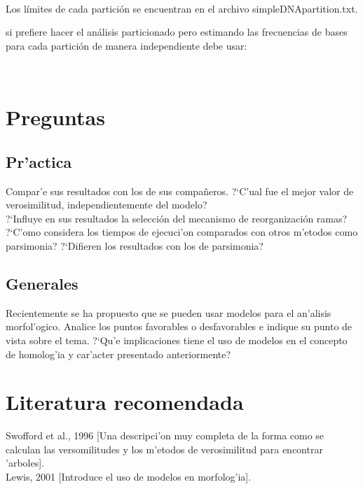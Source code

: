 
\\
\noindent

Los l\'imites de cada partici\'on se encuentran en el archivo simpleDNApartition.txt.


si prefiere hacer el an\'alisis particionado pero estimando las frecuencias de bases para cada partici\'on de manera independiente debe usar:



\\
\noindent





\section{Preguntas}
\subsection{Pr'actica}
\noindent
Compar'e sus resultados con los de sus compa\~neros. ?`C'ual fue el mejor valor de verosimilitud, independientemente del modelo?\\
?`Influye en sus resultados la selecci\'on del mecanismo de 
reorganizaci\'on ramas? \\
?`C'omo considera los tiempos de ejecuci'on comparados con otros m'etodos como parsimonia? ?`Difieren los resultados con los de parsimonia?
\subsection{Generales}
\noindent
Recientemente se ha propuesto que se pueden usar modelos para el an'alisis morfol'ogico. Analice los puntos favorables o desfavorables e indique su punto de vista sobre el tema. ?`Qu'e implicaciones tiene el uso de modelos en el concepto de homolog'ia y car'acter presentado anteriormente?
\section{Literatura recomendada}
\noindent
Swofford et al., 1996 [Una descripci'on muy completa de la forma como se calculan las versomilitudes y los m'etodos de verosimilitud para encontrar 'arboles].\\
Lewis, 2001 [Introduce el uso de modelos en morfolog'ia].
